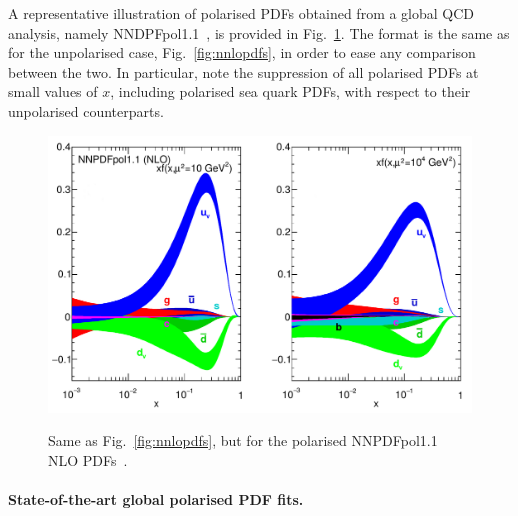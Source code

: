 A representative illustration of polarised PDFs obtained from a global
QCD analysis, namely NNDPFpol1.1~\cite{Nocera:2014gqa}, is provided in Fig.~\ref{fig:qPDFpol}.
%
The format is the same as for the unpolarised case, Fig.~\ref{fig:nnlopdfs},
in order to ease any comparison between the two.
%
In particular, note the suppression of all polarised PDFs at small values of 
$x$, including polarised sea quark PDFs, with respect to their unpolarised 
counterparts.

\begin{figure}[!t]
\centering
\includegraphics[scale=0.4]{plots/NNPDFpol}\\
\caption{\small Same as Fig.~\ref{fig:nnlopdfs}, 
but for the polarised NNPDFpol1.1 NLO PDFs~\cite{Nocera:2014gqa}.}
\label{fig:qPDFpol}
\end{figure}

\paragraph{State-of-the-art global polarised PDF fits.}

